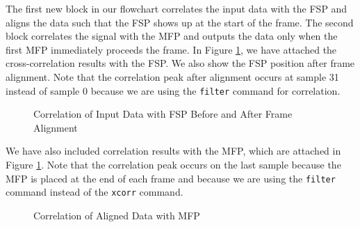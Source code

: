 \documentclass[conference,onecolumn]{IEEEtran}
\begin{document}
The first new block in our flowchart correlates the input data with the FSP and aligns the data such that the FSP shows up at the start of the frame. The second block correlates the signal with the MFP and outputs the data only when the first MFP immediately proceeds the frame. In Figure \ref{fig::fsp_correlation_gnu_radio}, we have attached the cross-correlation results with the FSP. We also show the FSP position after frame alignment. Note that the correlation peak after alignment occurs at sample 31 instead of sample 0 because we are using the \texttt{filter} command for correlation.

\begin{figure}[H]
	\centerline{}
	\caption{Correlation of Input Data with FSP Before and After Frame Alignment}
	\label{fig::fsp_correlation_gnu_radio}
\end{figure}

We have also included correlation results with the MFP, which are attached in Figure \ref{fig::fsp_correlation_gnu_radio}. Note that the correlation peak occurs on the last sample because the MFP is placed at the end of each frame and because we are using the \texttt{filter} command instead of the \texttt{xcorr} command.

\begin{figure}[H]
	\centerline{}
	\caption{Correlation of Aligned Data with MFP}
	\label{fig::mfp_correlation_gnu_radio}
\end{figure}

\end{document}
